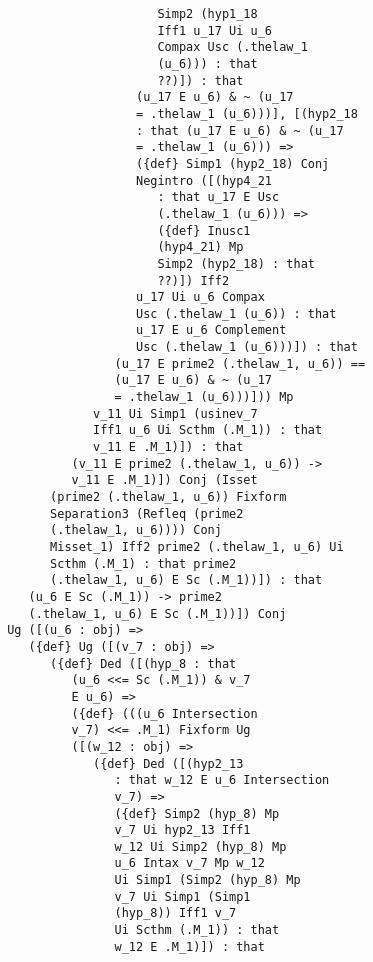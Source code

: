 \documentclass[12pt]{article}
\begin{document}
\begin{verbatim}
                            Simp2 (hyp1_18 
                            Iff1 u_17 Ui u_6 
                            Compax Usc (.thelaw_1 
                            (u_6))) : that 
                            ??)]) : that 
                         (u_17 E u_6) & ~ (u_17 
                         = .thelaw_1 (u_6)))], [(hyp2_18 
                         : that (u_17 E u_6) & ~ (u_17 
                         = .thelaw_1 (u_6))) => 
                         ({def} Simp1 (hyp2_18) Conj 
                         Negintro ([(hyp4_21 
                            : that u_17 E Usc 
                            (.thelaw_1 (u_6))) => 
                            ({def} Inusc1 
                            (hyp4_21) Mp 
                            Simp2 (hyp2_18) : that 
                            ??)]) Iff2 
                         u_17 Ui u_6 Compax 
                         Usc (.thelaw_1 (u_6)) : that 
                         u_17 E u_6 Complement 
                         Usc (.thelaw_1 (u_6)))]) : that 
                      (u_17 E prime2 (.thelaw_1, u_6)) == 
                      (u_17 E u_6) & ~ (u_17 
                      = .thelaw_1 (u_6)))])) Mp 
                   v_11 Ui Simp1 (usinev_7 
                   Iff1 u_6 Ui Scthm (.M_1)) : that 
                   v_11 E .M_1)]) : that 
                (v_11 E prime2 (.thelaw_1, u_6)) -> 
                v_11 E .M_1)]) Conj (Isset 
             (prime2 (.thelaw_1, u_6)) Fixform 
             Separation3 (Refleq (prime2 
             (.thelaw_1, u_6)))) Conj 
             Misset_1) Iff2 prime2 (.thelaw_1, u_6) Ui 
             Scthm (.M_1) : that prime2 
             (.thelaw_1, u_6) E Sc (.M_1))]) : that 
          (u_6 E Sc (.M_1)) -> prime2 
          (.thelaw_1, u_6) E Sc (.M_1))]) Conj 
       Ug ([(u_6 : obj) => 
          ({def} Ug ([(v_7 : obj) => 
             ({def} Ded ([(hyp_8 : that 
                (u_6 <<= Sc (.M_1)) & v_7 
                E u_6) => 
                ({def} (((u_6 Intersection 
                v_7) <<= .M_1) Fixform Ug 
                ([(w_12 : obj) => 
                   ({def} Ded ([(hyp2_13 
                      : that w_12 E u_6 Intersection 
                      v_7) => 
                      ({def} Simp2 (hyp_8) Mp 
                      v_7 Ui hyp2_13 Iff1 
                      w_12 Ui Simp2 (hyp_8) Mp 
                      u_6 Intax v_7 Mp w_12 
                      Ui Simp1 (Simp2 (hyp_8) Mp 
                      v_7 Ui Simp1 (Simp1 
                      (hyp_8)) Iff1 v_7 
                      Ui Scthm (.M_1)) : that 
                      w_12 E .M_1)]) : that 

\end{verbatim}
\end{document}
